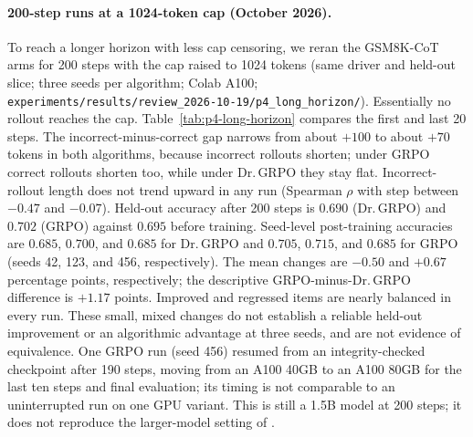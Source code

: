 \paragraph{200-step runs at a 1024-token cap (October 2026).}
To reach a longer horizon with less cap censoring, we reran the GSM8K-CoT arms for
200 steps with the cap raised to 1024 tokens (same driver and held-out slice;
three seeds per algorithm; Colab A100;
\texttt{experiments/results/review\_2026-10-19/p4\_long\_horizon/}).
Essentially no rollout reaches the cap. Table~\ref{tab:p4-long-horizon}
compares the first and last 20 steps. The incorrect-minus-correct gap narrows
from about $+100$ to about $+70$ tokens in both algorithms, because incorrect
rollouts shorten; under GRPO correct rollouts shorten too, while under
Dr.\,GRPO they stay flat. Incorrect-rollout length does not trend upward in any
run (Spearman $\rho$ with step between $-0.47$ and $-0.07$). Held-out accuracy
after 200 steps is $0.690$ (Dr.\,GRPO) and $0.702$ (GRPO) against $0.695$
before training. Seed-level post-training accuracies are $0.685$, $0.700$,
and $0.685$ for Dr.\,GRPO and $0.705$, $0.715$, and $0.685$ for GRPO
(seeds 42, 123, and 456, respectively). The mean changes are $-0.50$ and
$+0.67$ percentage points, respectively; the descriptive GRPO-minus-Dr.\,GRPO
difference is $+1.17$ points. Improved and regressed items are nearly balanced
in every run. These small, mixed changes do not establish a reliable
held-out improvement or an algorithmic advantage at three seeds, and are
not evidence of equivalence. One GRPO run (seed 456) resumed from an
integrity-checked checkpoint after 190 steps, moving from an A100 40GB to
an A100 80GB for the last ten steps and final evaluation; its timing is
not comparable to an uninterrupted run on one GPU variant. This is still
a 1.5B model at 200 steps; it does not reproduce
the larger-model setting of \cite{tong2025drgrpo}.

\begin{table}[htbp]
\centering
{}
\caption{GSM8K-CoT, Qwen2.5-1.5B-Instruct, 200 steps, 1024-token cap; mean
$\pm$ SD over three seeds. Generated by \texttt{scripts/table.py} from the raw
per-rollout logs.}
\label{tab:p4-long-horizon}
\end{table}

